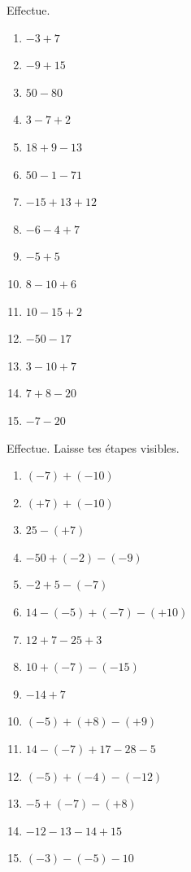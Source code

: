 \documentclass[../../syllabus_1.tex]{subfiles}
\begin{document}
\begin{exercise}
    Effectue.
    \begin{enumerate}[cols=3]
        \item $-3+7$
        \item $-9+15$
        \item $50-80$
        \item $3-7+2$
        \item $18+9-13$
        \item $50-1-71$
        \item $-15 +13 +12$
        \item $-6 -4 +7$
        \item $-5 + 5$
        \item $8 - 10 + 6$
        \item $10-15+2$
        \item $-50-17$
        \item $3-10+7$
        \item $7 + 8 - 20$
        \item $-7 -20$
    \end{enumerate}
\end{exercise}

\newpage
\begin{exercise}
    Effectue. Laisse tes étapes visibles.
    \begin{enumerate}[cols=3]
        \item $(-7)+(-10)$
        \item $( + 7) + ( - 10)$
        \item $25 - ( + 7)$
        \item $-50+(-2)-(-9)$
        \item $-2+5-(-7)$
        \item $14-(-5)+(-7)-(+10)$
        \item $12 + 7 - 25 + 3$
        \item $10 + ( - 7) - ( - 15)$
        \item $- 14 + 7$
        \item $( - 5) + ( + 8) - ( + 9)$
        \item $14 - ( - 7) + 17 - 28 - 5$
        \item $( - 5) + ( - 4) - ( - 12)$
        \item $- 5 + ( - 7) - ( + 8)$
        \item $- 12 - 13 - 14 + 15$
        \item $(-3)- (-5) - 10$
    \end{enumerate}
\end{exercise}
\end{document}
